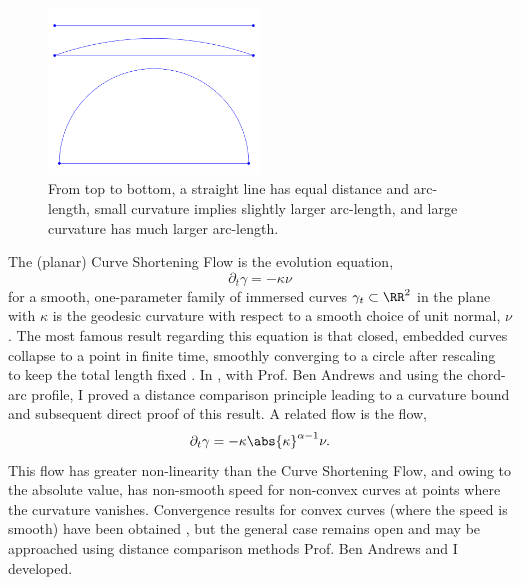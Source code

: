 \documentclass[12pt]{amsart}
\begin{document}
\begin{figure}[htb]
\centering
\includegraphics[width=0.5\textwidth]{img/chord_arc.png}
\caption{\label{fg:chord_arc}From top to bottom, a straight line has equal distance and arc-length, small curvature implies slightly larger arc-length, and large curvature has much larger arc-length.}
\end{figure}

The (planar) Curve Shortening Flow is the evolution equation,
\[
\partial_t \gamma = - \kappa\nu
\]
for a smooth, one-parameter family of immersed curves $\gamma_t \subset \RR^2$ in the plane with $\kappa$ is the geodesic curvature with respect to a smooth choice of unit normal, $\nu$. The most famous result regarding this equation is that closed, embedded curves collapse to a point in finite time, smoothly converging to a circle after rescaling to keep the total length fixed \cite{MR840401,MR906392}. In \cite{MR2794630}, with Prof. Ben Andrews and using the chord-arc profile, I proved a distance comparison principle leading to a curvature bound and subsequent direct proof of this result. A related flow is the flow,
\[
\partial_t \gamma = -\kappa\abs{\kappa}^{\alpha-1} \nu.
\]
This flow has greater non-linearity than the Curve Shortening Flow, and owing to the absolute value, has non-smooth speed for non-convex curves at points where the curvature vanishes. Convergence results for convex curves (where the speed is smooth) have been obtained \cite{MR1660843}, but the general case remains open and may be approached using distance comparison methods Prof. Ben Andrews and I developed.
\end{document}
